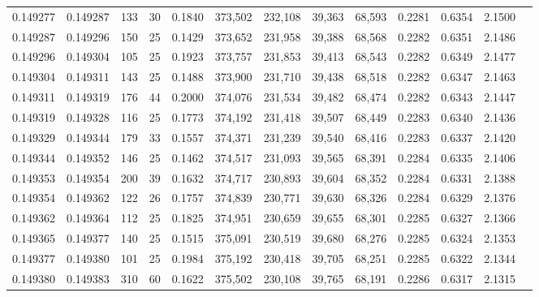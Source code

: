 \begin{tabular}{rrrrrrrrrrrrr}
0.149277 & 0.149287 & 133 &  30 &                                     0.1840 & 373,502 & 232,108 &  39,363 &  68,593 & 0.2281 & 0.6354 & 2.1500 \\
0.149287 & 0.149296 & 150 &  25 &                                     0.1429 & 373,652 & 231,958 &  39,388 &  68,568 & 0.2282 & 0.6351 & 2.1486 \\
0.149296 & 0.149304 & 105 &  25 &                                     0.1923 & 373,757 & 231,853 &  39,413 &  68,543 & 0.2282 & 0.6349 & 2.1477 \\
0.149304 & 0.149311 & 143 &  25 &                                     0.1488 & 373,900 & 231,710 &  39,438 &  68,518 & 0.2282 & 0.6347 & 2.1463 \\
0.149311 & 0.149319 & 176 &  44 &                                     0.2000 & 374,076 & 231,534 &  39,482 &  68,474 & 0.2282 & 0.6343 & 2.1447 \\
0.149319 & 0.149328 & 116 &  25 &                                     0.1773 & 374,192 & 231,418 &  39,507 &  68,449 & 0.2283 & 0.6340 & 2.1436 \\
0.149329 & 0.149344 & 179 &  33 &                                     0.1557 & 374,371 & 231,239 &  39,540 &  68,416 & 0.2283 & 0.6337 & 2.1420 \\
0.149344 & 0.149352 & 146 &  25 &                                     0.1462 & 374,517 & 231,093 &  39,565 &  68,391 & 0.2284 & 0.6335 & 2.1406 \\
0.149353 & 0.149354 & 200 &  39 &                                     0.1632 & 374,717 & 230,893 &  39,604 &  68,352 & 0.2284 & 0.6331 & 2.1388 \\
0.149354 & 0.149362 & 122 &  26 &                                     0.1757 & 374,839 & 230,771 &  39,630 &  68,326 & 0.2284 & 0.6329 & 2.1376 \\
0.149362 & 0.149364 & 112 &  25 &                                     0.1825 & 374,951 & 230,659 &  39,655 &  68,301 & 0.2285 & 0.6327 & 2.1366 \\
0.149365 & 0.149377 & 140 &  25 &                                     0.1515 & 375,091 & 230,519 &  39,680 &  68,276 & 0.2285 & 0.6324 & 2.1353 \\
0.149377 & 0.149380 & 101 &  25 &                                     0.1984 & 375,192 & 230,418 &  39,705 &  68,251 & 0.2285 & 0.6322 & 2.1344 \\
0.149380 & 0.149383 & 310 &  60 &                                     0.1622 & 375,502 & 230,108 &  39,765 &  68,191 & 0.2286 & 0.6317 & 2.1315 \\

\end{tabular}

